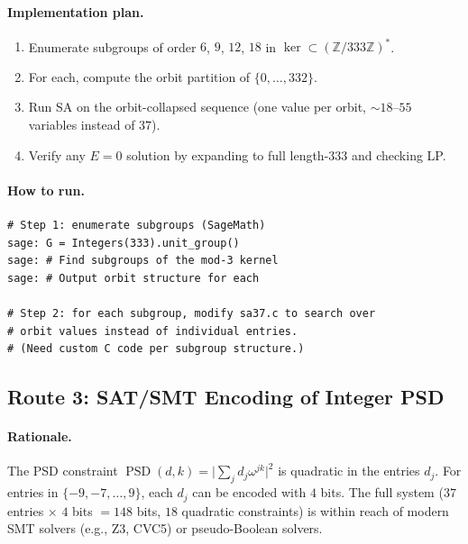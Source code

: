 \documentclass[11pt,a4paper]{article}
\newcommand{\Z}{\mathbb{Z}}
\newcommand{\abs}[1]{\lvert #1 \rvert}
\newcommand{\PSD}{\operatorname{PSD}}
\theoremstyle{plain}
\theoremstyle{definition}
\theoremstyle{remark}
\begin{document}
\paragraph{Implementation plan.}
\begin{enumerate}
\item Enumerate subgroups of order $6$, $9$, $12$, $18$ in $\ker\subset(\Z/333\Z)^*$.
\item For each, compute the orbit partition of $\{0,\dots,332\}$.
\item Run SA on the orbit-collapsed sequence (one value per orbit, $\sim18$--$55$ variables instead of $37$).
\item Verify any $E=0$ solution by expanding to full length-$333$ and checking LP.
\end{enumerate}

\paragraph{How to run.}
\begin{lstlisting}
# Step 1: enumerate subgroups (SageMath)
sage: G = Integers(333).unit_group()
sage: # Find subgroups of the mod-3 kernel
sage: # Output orbit structure for each

# Step 2: for each subgroup, modify sa37.c to search over
# orbit values instead of individual entries.
# (Need custom C code per subgroup structure.)
\end{lstlisting}

\subsection{Route 3: SAT/SMT Encoding of Integer PSD}
\label{sec:route3}

\paragraph{Rationale.} The PSD constraint $\PSD(d,k)=\abs{\sum_j d_j\omega^{jk}}^2$ is quadratic in the entries $d_j$. For entries in $\{-9,-7,\dots,9\}$, each $d_j$ can be encoded with $4$ bits. The full system ($37$ entries $\times$ $4$ bits $=148$ bits, $18$ quadratic constraints) is within reach of modern SMT solvers (e.g., Z3, CVC5) or pseudo-Boolean solvers.
\end{document}
